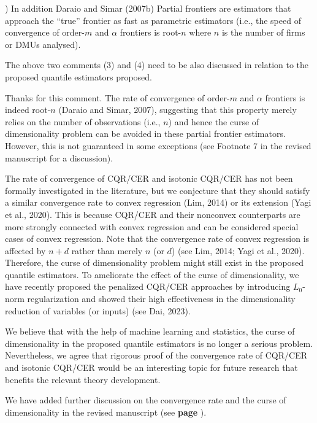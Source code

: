 \documentclass[12pt]{article}
\newcommand{\np}{\vskip 0.3cm}
\begin{document}
\np
\np
\np
\begin{sf}
{) In addition Daraio and Simar (2007b) Partial frontiers are estimators that approach the ``true'' frontier as fast as parametric estimators (i.e., the speed of convergence of order-$m$ and $\alpha$ frontiers is root-$n$ where $n$ is the number of firms or DMUs analysed). \np

The above two comments (3) and (4) need to be also discussed in relation to the proposed quantile estimators proposed.}
\end{sf}
\begin{response}
Thanks for this comment. The rate of convergence of order-$m$ and $\alpha$ frontiers is indeed root-$n$ (Daraio and Simar, 2007), suggesting that this property merely relies on the number of observations (i.e., $n$) and hence the curse of dimensionality problem can be avoided in these partial frontier estimators. However, this is not guaranteed in some exceptions (see Footnote 7 in the revised manuscript for a discussion).  

The rate of convergence of CQR/CER and isotonic CQR/CER has not been formally investigated in the literature, but we conjecture that they should satisfy a similar convergence rate to convex regression (Lim, 2014) or its extension (Yagi et al., 2020). This is because CQR/CER and their nonconvex counterparts are more strongly connected with convex regression and can be considered special cases of convex regression. Note that the convergence rate of convex regression is affected by $n + d$ rather than merely $n$ (or $d$) (see Lim, 2014; Yagi et al., 2020). Therefore, the curse of dimensionality problem might still exist in the proposed quantile estimators. To ameliorate the effect of the curse of dimensionality, we have recently proposed the penalized CQR/CER approaches by introducing $L_0$-norm regularization and showed their high effectiveness in the dimensionality reduction of variables (or inputs) (see Dai, 2023). \np

We believe that with the help of machine learning and statistics, the curse of dimensionality in the proposed quantile estimators is no longer a serious problem. Nevertheless, we agree that rigorous proof of the convergence rate of CQR/CER and isotonic CQR/CER would be an interesting topic for future research that benefits the relevant theory development. \np

We have added further discussion on the convergence rate and the curse of dimensionality in the revised manuscript (see \textbf{page }).

\end{response}
\end{document}
